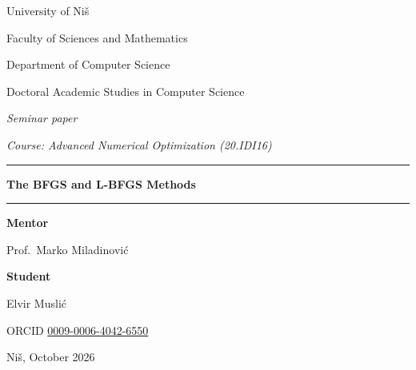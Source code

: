 \documentclass[11pt,a4paper]{amsart}
\numberwithin{equation}{section}
\theoremstyle{plain}
\theoremstyle{definition}
\theoremstyle{remark}
\begin{document}
\thispagestyle{empty}
\begin{center}
  {\large University of Niš\par}
  {\large Faculty of Sciences and Mathematics\par}
  \smallskip
  Department of Computer Science\par
  Doctoral Academic Studies in Computer Science\par

  \vspace{3em}
  {\itshape Seminar paper\par}
  {\itshape Course: Advanced Numerical Optimization (20.IDI16)\par}

  \vspace{3.5em}
  \rule{\linewidth}{0.4pt}\par
  \vspace{1em}
  {\LARGE\bfseries The BFGS and L-BFGS Methods\par}
  \vspace{1em}
  \rule{\linewidth}{0.4pt}\par
\end{center}

\vspace{3.5em}
\noindent
\begin{minipage}[t]{0.49\linewidth}
  \raggedright
  \textbf{Mentor}\par
  Prof.\ Marko Miladinović
\end{minipage}\hfill
\begin{minipage}[t]{0.49\linewidth}
  \raggedleft
  \textbf{Student}\par
  Elvir Muslić\,\par
  ORCID \href{https://orcid.org/0009-0006-4042-6550}{0009-0006-4042-6550}
\end{minipage}

\vfill
\begin{center}Niš, October 2026\end{center}
\newpage
\end{document}
